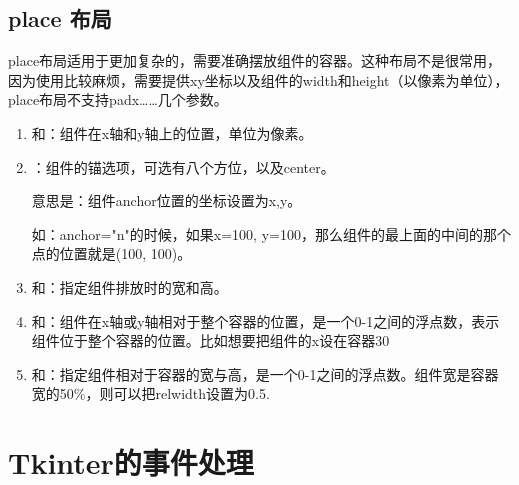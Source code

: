 \subsection{place 布局}
place布局适用于更加复杂的，需要准确摆放组件的容器。这种布局不是很常用，因为使用比较麻烦，需要提供xy坐标以及组件的width和height（以像素为单位），place布局不支持padx……几个参数。

\begin{enumerate}[label=\arabic*)]
    \item {}和：组件在x轴和y轴上的位置，单位为像素。
    \item {}：组件的锚选项，可选有八个方位，以及center。
    
    意思是：组件anchor位置的坐标设置为x,y。
    
    如：anchor="n"的时候，如果x=100, y=100，那么组件的最上面的中间的那个点的位置就是(100, 100)。

    \item {}和：指定组件排放时的宽和高。
    \item {}和：组件在x轴或y轴相对于整个容器的位置，是一个0-1之间的浮点数，表示组件位于整个容器的位置。比如想要把组件的x设在容器30%
    \item {}和：指定组件相对于容器的宽与高，是一个0-1之间的浮点数。组件宽是容器宽的50\%，则可以把relwidth设置为0.5.
\end{enumerate}



\section{Tkinter的事件处理}


